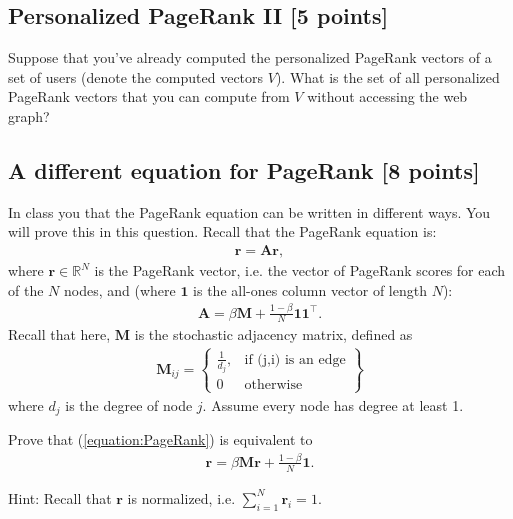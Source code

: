\subsection{Personalized PageRank II [5 points]}

Suppose that you've already computed the personalized PageRank vectors of a set
of users (denote the computed vectors $V$). What is the set of all personalized
PageRank vectors that you can compute from $V$ without accessing the web graph?

\subsection{A different equation for PageRank [8 points]}
In class you that the PageRank equation can be written in different ways. You will prove this in this question.
Recall that the PageRank equation is:
\begin{align}
\label{equation:PageRank}
    \mathbf{r} = \mathbf{A} \mathbf{r},
\end{align}
where $\mathbf{r} \in \mathbb{R}^N$ is the PageRank vector, i.e. the vector of PageRank scores for each of the $N$ nodes, and (where $\mathbf{1}$ is the all-ones column vector of length $N$):
\begin{align}
    \mathbf{A} = \beta \mathbf{M} + \frac{1-\beta}{N}\mathbf{1}\mathbf{1}^\top.
\end{align}
Recall that here, $\mathbf{M}$ is the stochastic adjacency matrix, defined as
\begin{align}
    \mathbf{M}_{ij} = \left\{\begin{array}{lr}
        \frac{1}{d_j} , & \text{if (j,i) is an edge}\\
        0               & \text{otherwise}
        \end{array}\right\}
\end{align}
where $d_j$ is the degree of node $j$. Assume every node has degree at least 1.

Prove that (\ref{equation:PageRank}) is equivalent to
\begin{align}
    \mathbf{r} = \beta\mathbf{M} \mathbf{r}  + \frac{1-\beta}{N}\mathbf{1}.
\end{align}

Hint: Recall that $\mathbf{r}$ is normalized, i.e. $\sum_{i=1}^N \mathbf{r}_i = 1$.

